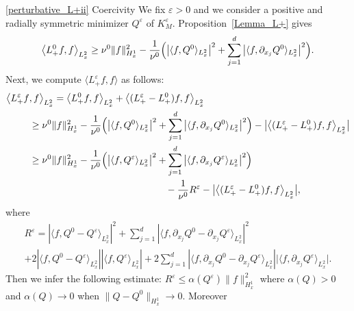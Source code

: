 \begin{ProofOf}{\eqref{perturbative_L+ii} Coercivity}
We fix $\varepsilon>0$ and we consider a positive and radially symmetric minimizer $Q^{\varepsilon}$ of $K_{M}^{\varepsilon}$. Proposition~\ref{Lemma_L+} gives
\[
\left\langle L_{+}^{0}f,f\right\rangle_{L_{x}^{2}}\geq\nu^{0}\|f\|_{H_{x}^{1}}^{2}-\frac{1}{\nu^{0}}\Bigl(\left|\langle f,Q^{0}\rangle_{L_{x}^{2}}\right|^{2}+\sum\limits_{j=1}^{d}\left|\langle f,\partial_{x_{j}}Q^{0}\rangle_{L_{x}^{2}}\right|^{2}\Bigr).
\]
Next, we compute $\langle L_{+}^{\varepsilon}f,f\rangle$ as follows:
\begin{align*}
\bigl\langle L_{+}^{\varepsilon}f&,f\bigr\rangle_{L_{x}^{2}}=\left\langle L_{+}^{0}f,f\right\rangle_{L_{x}^{2}}+\left\langle (L_{+}^{\varepsilon}-L_{+}^{0})f,f\right\rangle_{L_{x}^{2}}\\
&\geq\nu^{0}\|f\|_{H_{x}^{1}}^{2}-\frac{1}{\nu^{0}}\Bigl(\left|\langle f,Q^{0}\rangle_{L_{x}^{2}}\right|^{2}+\sum\limits_{j=1}^{d}\left|\langle f,\partial_{x_{j}}Q^{0}\rangle_{L_{x}^{2}}\right|^{2}\Bigr)-\bigl|\left\langle(L_{+}^{\varepsilon}-L_{+}^{0})f,f\right\rangle_{L_{x}^{2}}\bigr|
\\
&\geq\nu^{0}\|f\|_{H_{x}^{1}}^{2}-\frac{1}{\nu^{0}}\Bigl(\left|\langle f,Q^{\varepsilon}\rangle_{L_{x}^{2}}\right|^{2}+\sum\limits_{j=1}^{d}\left|\langle f,\partial_{x_{j}}Q^{\varepsilon}\rangle_{L_{x}^{2}}\right|^{2}\Bigr)
\\
&\hspace*{5cm}-\frac{1}{\nu^{0}}R^{\varepsilon}-\bigl|\left\langle(L_{+}^{\varepsilon}-L_{+}^{0})f,f\right\rangle_{L_{x}^{2}}\bigr|,
\end{align*}
where\vspace*{-5pt}
\begin{multline*}
R^{\varepsilon}=\left|\langle f,Q^{0}-Q^{\varepsilon}\rangle_{L_{x}^{2}}\right|^{2}+\sum\limits_{j=1}^{d}\left|\langle f,\partial_{x_{j}}Q^{0}-\partial_{x_{j}}Q^{\varepsilon}\rangle_{L_{x}^{2}}\right|^{2}\\[
-8pt]
+2\left|\langle f,Q^{0}-Q^{\varepsilon}\rangle_{L_{x}^{2}}\right|\left|\langle f,Q^{\varepsilon}\rangle_{L_{x}^{2}}\right|+2\sum\limits_{j=1}^{d}\left|\langle f,\partial_{x_{j}}Q^{0}-\partial_{x_{j}}Q^{\varepsilon}\rangle_{L_{x}^{2}}\right|\bigl|\langle f,\partial_{x_{j}}Q^{\varepsilon}\rangle_{L_{x}^{2}}\bigr|.
\end{multline*}
Then we infer the following estimate: $R^{\varepsilon}\!\leq\!\alpha(Q^{\varepsilon})\|f\|_{H_{x}^{1}}^{2}$ where $\alpha(Q)\!>\!0$ and \hbox{$\alpha(Q)\!\to\! 0$} when $\|Q-Q^{0}\|_{H_{x}^{1}}\to 0$. Moreover\vspace*{-5pt}

\end{ProofOf}
